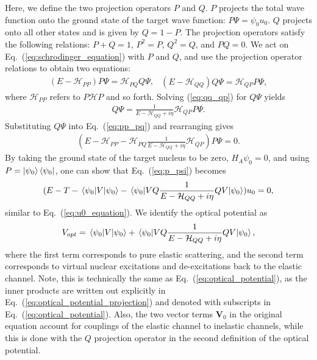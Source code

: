 \documentclass[preprintnumbers,floatfix,aps,prc,preprint,nofootinbib]{revtex4-1}
\begin{document}
Here, we define the two projection operators $P$ and $Q$. $P$ projects the total wave function onto the ground state of the target wave function: $P \Psi = \psi_0 u_0$. $Q$ projects onto all other states and is given by $Q = 1-P$. The projection operators satisfy the following relations: $P+Q=1$, $P^2 = P$, $Q^2 = Q$, and $P Q = 0$. We act on Eq.~(\ref{eq:schrodinger_equation}) with $P$ and $Q$, and use the projection operator relations to obtain two equations:
%
\begin{subequations}
	\label{eq:intermediate_effective_hamiltonian_equations}
	\begin{eqnarray}
		\label{eq:pp_pq}
		(E - \mathcal{H}_{PP}) P \Psi = \mathcal{H}_{PQ} Q \Psi,
	\end{eqnarray}
	\begin{eqnarray}
		\label{eq:qq_qp}
		(E - \mathcal{H}_{QQ}) Q \Psi = \mathcal{H}_{QP} P \Psi,
	\end{eqnarray}
\end{subequations}
%
where $\mathcal{H}_{PP}$ refers to $P \mathcal{H} P$ and so forth. Solving (\ref{eq:qq_qp}) for $Q \Psi$ yields
%
\begin{eqnarray}
	\label{eq:q_psi}
	Q \Psi = \frac{1}{E - \mathcal{H}_{QQ} + i \eta} \mathcal{H}_{QP} P \Psi.
\end{eqnarray}
%
Substituting $Q \Psi$ into Eq.~(\ref{eq:pp_pq}) and rearranging gives
%
\begin{eqnarray}
	\label{eq:p_psi}
	(E - \mathcal{H}_{PP} - \mathcal{H}_{PQ} \frac{1}{E - \mathcal{H}_{QQ} + i \eta} \mathcal{H}_{QP}) P \Psi = 0.
\end{eqnarray}
%
By taking the ground state of the target nucleus to be zero, $H_A \psi_0 = 0$,  and using $P = \ket{\psi_0} \bra{\psi_0}$, one can show that Eq.~(\ref{eq:p_psi}) becomes
%
\begin{eqnarray}
	\label{eq:p_psi_optical_potential}
	(E - T - \mel{\psi_0}{V}{\psi_0} - \mel{\psi_0}{V Q \frac{1}{E - \mathcal{H}_{QQ} + i \eta} Q V}{\psi_0}) u_0 = 0,
\end{eqnarray}
%
similar to Eq.~(\ref{eq:u0_equation}). We identify the optical potential as
%
\begin{eqnarray}
	\label{eq:optical_potential_projection}
	V_{opt} = \mel{\psi_0}{V}{\psi_0} + \mel{\psi_0}{V Q \frac{1}{E - \mathcal{H}_{QQ} + i \eta} Q V}{\psi_0},
\end{eqnarray}
% 
where the first term corresponds to pure elastic scattering, and the second term corresponds to virtual nuclear excitations and de-excitations back to the elastic channel. Note, this is technically the same as Eq.~(\ref{eq:optical_potential}), as the inner products are written out explicitly in Eq.~(\ref{eq:optical_potential_projection}) and denoted with subscripts in Eq.~(\ref{eq:optical_potential}). Also, the two vector terms $\textbf{V}_0$ in the original equation account for couplings of the elastic channel to inelastic channels, while this is done with the $Q$ projection operator in the second definition of the optical potential.
\end{document}
